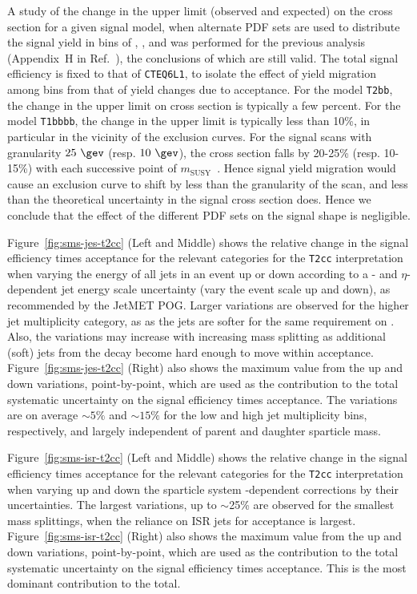 A study of the change in the upper limit (observed and expected) on
the cross section for a given signal model, when alternate PDF sets
are used to distribute the signal yield in bins of \scalht, \nb, and
\njet was performed for the previous analysis (Appendix~H in
Ref.~\cite{RA1Paper2012ANHCP}), the conclusions of which are still
valid. The total signal efficiency is fixed to that of \verb!CTEQ6L1!,
to isolate the effect of yield migration among bins from that of yield
changes due to acceptance. For the model \verb!T2bb!, the change in
the upper limit on cross section is typically a few percent. For the
model \verb!T1bbbb!, the change in the upper limit is typically less
than 10\%, in particular in the vicinity of the exclusion curves. For
the signal scans with granularity $25~\gev$ (resp. $10~\gev$), the
cross section falls by 20-25\% (resp. 10-15\%) with each successive
point of $m_\mathrm{SUSY}$~\cite{ref-eight-tev-susy-xs}. Hence signal
yield migration would cause an exclusion curve to shift by less than
the granularity of the scan, and less than the theoretical uncertainty
in the signal cross section does. Hence we conclude that the effect of
the different PDF sets on the signal shape is negligible.

Figure~\ref{fig:sms-jes-t2cc} (Left and Middle) shows the relative
change in the signal efficiency times acceptance for the relevant
categories for the \verb!T2cc! interpretation when varying the energy
of all jets in an event up or down according to a \pt- and
$\eta$-dependent jet energy scale uncertainty (\ie vary the event
scale up and down), as recommended by the JetMET POG. Larger
variations are observed for the higher jet multiplicity category, as
as the jets are softer for the same requirement on \scalht. Also, the
variations may increase with increasing mass splitting as additional
(soft) jets from the decay become hard enough to move within
acceptance. Figure~\ref{fig:sms-jes-t2cc} (Right) also shows the
maximum value from the up and down variations, point-by-point, which
are used as the contribution to the total systematic uncertainty on
the signal efficiency times acceptance. The variations are on average
$\sim5\%$ and $\sim15\%$ for the low and high jet multiplicity bins,
respectively, and largely independent of parent and daughter sparticle
mass. 

Figure~\ref{fig:sms-isr-t2cc} (Left and Middle) shows the relative
change in the signal efficiency times acceptance for the relevant
categories for the \verb!T2cc! interpretation when varying up and down
the sparticle system \Pt-dependent corrections by their
uncertainties. The largest variations, up to $\sim$25\% are observed
for the smallest mass splittings, when the reliance on ISR jets for
acceptance is largest. Figure~\ref{fig:sms-isr-t2cc} (Right) also
shows the maximum value from the up and down variations,
point-by-point, which are used as the contribution to the total
systematic uncertainty on the signal efficiency times acceptance. This
is the most dominant contribution to the total.


